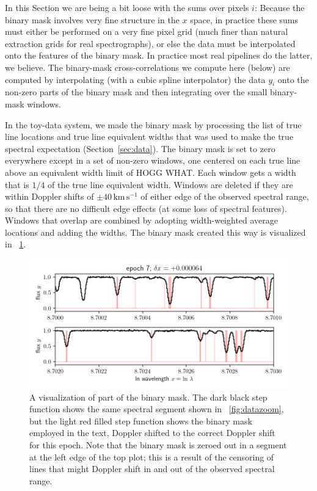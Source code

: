 \documentclass[modern]{aastex631}
\newcommand{\unit}[1]{\mathrm{#1}}
\newcommand{\km}{\unit{km}}
\newcommand{\s}{\unit{s}}
\newcommand{\kmps}{\km\,\s^{-1}}
\newcommand{\sectionname}{Section}
\newcommand{\secref}[1]{\sectionname~\ref{#1}}
\newcommand{\figref}[1]{\figurename~\ref{#1}}
\begin{document}
In this \sectionname{} we are being a bit loose with the sums over pixels $i$:
Because the binary mask involves very fine structure in the $x$ space, in practice these sums must either be performed on a very fine pixel grid (much finer than natural extraction grids for real spectrographs), or else the data must be interpolated onto the features of the binary mask.
In practice most real pipelines do the latter, we believe.
The binary-mask cross-correlations we compute here (below) are computed by interpolating (with a cubic spline interpolator) the data $y_i$ onto the non-zero parts of the binary mask and then integrating over the small binary-mask windows.

In the toy-data system, we made the binary mask by processing the list of true line locations and true line equivalent widths that was used to make the true spectral expectation (\secref{sec:data}).
The binary mask is set to zero everywhere except in a set of non-zero windows, one centered on each true line above an equivalent width limit of HOGG WHAT.
Each window gets a width that is $1/4$ of the true line equivalent width.
Windows are deleted if they are within Doppler shifts of $\pm 40\,\kmps$ of either edge of the observed spectral range, so that there are no difficult edge effects (at some loss of spectral features).
Windows that overlap are combined by adopting width-weighted average locations and adding the widths.
The binary mask created this way is visualized in \figref{fig:binarymask}.

\begin{figure}[tp]
  \begin{mdframed}
    \begin{center}
    \includegraphics[width=\textwidth]{../notebook/binarymask.png}
    \end{center}
    \caption{A visualization of part of the binary mask. The dark black step function shows the same spectral segment shown in \figref{fig:datazoom}, but the light red filled step function shows the binary mask employed in the text, Doppler shifted to the correct Doppler shift for this epoch. Note that the binary mask is zeroed out in a segment at the left edge of the top plot; this is a result of the censoring of lines that might Doppler shift in and out of the observed spectral range.\label{fig:binarymask}}
  \end{mdframed}
\end{figure}
\end{document}
